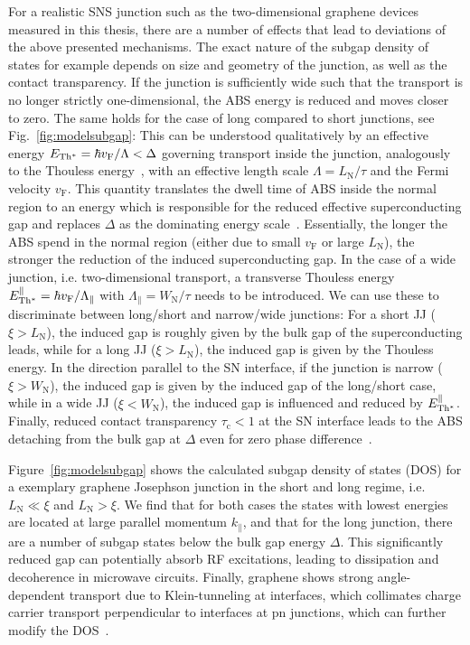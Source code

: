 For a realistic SNS junction such as the two-dimensional graphene devices measured in this thesis, there are a number of effects that lead to deviations of the above presented mechanisms.
%
The exact nature of the subgap density of states for example depends on size and geometry of the junction, as well as the contact transparency.
%
If the junction is sufficiently wide such that the transport is no longer strictly one-dimensional, the ABS energy is reduced and moves closer to zero.
%
The same holds for the case of long compared to short junctions, see Fig.~\ref{fig:modelsubgap}:
%
This can be understood qualitatively by an effective energy $E_{\rm Th^*}=\hbar v_\text{F}/\Lambda<\Delta$ governing transport inside the junction, analogously to the Thouless energy~\cite{benshalomQuantumOscillationsCritical2015,schmidtBallisticGrapheneSuperconducting2018}, with an effective length scale $\Lambda=L_\text{N}/\tau$ and the Fermi velocity $v_\text{F}$.
%
This quantity translates the dwell time of ABS inside the normal region to an energy which is responsible for the reduced effective superconducting gap and replaces $\Delta$ as the dominating energy scale~\cite{laevenEnhancedProximityEffect2019}.
%
Essentially, the longer the ABS spend in the normal region (either due to small $v_\text{F}$ or large $L_\text{N}$), the stronger the reduction of the induced superconducting gap.
%
In the case of a wide junction, i.e. two-dimensional transport, a transverse Thouless energy $E_{\rm Th^*}^\parallel=\hbar v_\text{F}/\Lambda_\parallel$ with $\Lambda_\parallel=W_\text{N}/\tau$ needs to be introduced.
%
We can use these to discriminate between long/short and narrow/wide junctions:
%
For a short JJ ($\xi>L_\text{N}$), the induced gap is roughly given by the bulk gap of the superconducting leads, while for a long JJ ($\xi>L_\text{N}$), the induced gap is given by the Thouless energy.
%
In the direction parallel to the SN interface, if the junction is narrow ($\xi>W_\text{N}$), the induced gap is given by the induced gap of the long/short case, while in a wide JJ ($\xi<W_\text{N}$), the induced gap is influenced and reduced by $E_{\rm Th^*}^\parallel$.
%
Finally, reduced contact transparency $\tau_\text{c}<1$ at the SN interface leads to the ABS detaching from the bulk gap at $\Delta$ even for zero phase difference~\cite{bretheauTunnellingSpectroscopyAndreev2017a}.


Figure~\ref{fig:modelsubgap} shows the calculated subgap density of states (DOS) for a exemplary graphene Josephson junction in the short and long regime, i.e. $L_\text{N}\ll\xi$ and $L_\text{N}>\xi$.
%
We find that for both cases the states with lowest energies are located at large parallel momentum $k_\parallel$, and that for the long junction, there are a number of subgap states below the bulk gap energy $\Delta$.
%
This significantly reduced gap can potentially absorb RF excitations, leading to dissipation and decoherence in microwave circuits.
%
Finally, graphene shows strong angle-dependent transport due to Klein-tunneling at interfaces, which collimates charge carrier transport perpendicular to interfaces at pn junctions, which can further modify the DOS~\cite{beenakkerColloquiumAndreevReflection2008}.

